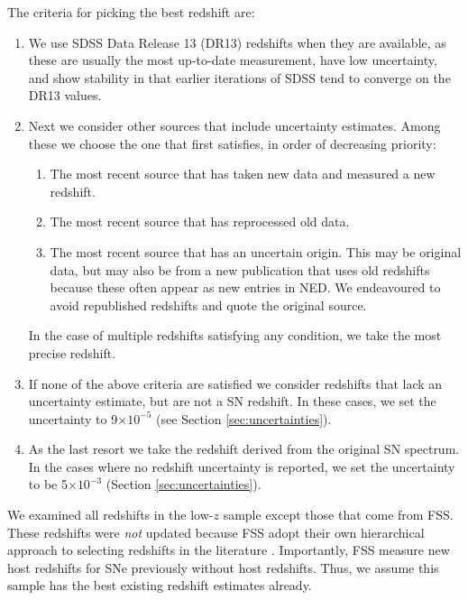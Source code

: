 \documentclass[
  journal=pasa,
  manuscript=research-paper,
  year=2022,
]{cup-journal}
\newcommand{\tten}[1]{\ensuremath{\times 10^{#1}}}
\begin{document}
The criteria for picking the best redshift are:
\begin{enumerate}
    \item We use SDSS Data Release 13 (DR13) redshifts when they are available, as these are usually the most up-to-date measurement, have low uncertainty, and show stability in that earlier iterations of SDSS tend to converge on the DR13 values. 
    \item Next we consider other sources that include uncertainty estimates. Among these we choose the one that first satisfies, in order of decreasing priority:
    \begin{enumerate}
    \item The most recent source that has taken new data and measured a new redshift.
    \item The most recent source that has reprocessed old data.
    \item The most recent source that has an uncertain origin. This may be original data, but may also be from a new publication that uses old redshifts because these often appear as new entries in NED. We endeavoured to avoid republished redshifts and quote the original source. 
    \end{enumerate}
    In the case of multiple redshifts satisfying any condition, we take the most precise redshift.
    \item If none of the above criteria are satisfied we consider redshifts that lack an uncertainty estimate, but are not a SN redshift. In these cases, we set the uncertainty to 9\tten{-5} (see Section \ref{sec:uncertainties}). 
    \item As the last resort we take the redshift derived from the original SN spectrum. In the cases where no redshift uncertainty is reported, we set the uncertainty to be 5\tten{-3} (Section \ref{sec:uncertainties}).
\end{enumerate}

We examined all redshifts in the low-$z$ sample except those that come from FSS.
These redshifts were {\em not} updated because FSS adopt their own hierarchical approach to selecting redshifts in the literature \citep{Foley2018}.
Importantly, FSS measure new host redshifts for SNe previously without host redshifts.
Thus, we assume this sample has the best existing redshift estimates already.
\end{document}
